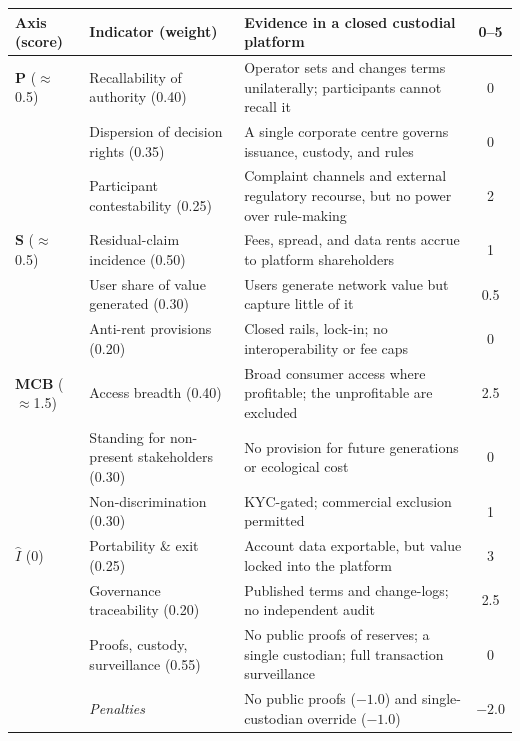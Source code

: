 \documentclass[11pt]{article}
\theoremstyle{definition}
\newcommand{\Iax}{\ensuremath{\hat{I}}}
\begin{document}
\begin{table}[!ht]
\centering\small
\renewcommand{\arraystretch}{1.25}
\begin{tabularx}{\textwidth}{@{}p{1.6cm}p{4.4cm}Xc@{}}
\toprule
\textbf{Axis (score)} & \textbf{Indicator (weight)} & \textbf{Evidence in a closed custodial platform} & \textbf{0--5} \\
\midrule
\textbf{P} \newline ($\approx$0.5)
  & Recallability of authority (0.40) & Operator sets and changes terms unilaterally; participants cannot recall it & 0 \\
  & Dispersion of decision rights (0.35) & A single corporate centre governs issuance, custody, and rules & 0 \\
  & Participant contestability (0.25) & Complaint channels and external regulatory recourse, but no power over rule-making & 2 \\
\addlinespace
\textbf{S} \newline ($\approx$0.5)
  & Residual-claim incidence (0.50) & Fees, spread, and data rents accrue to platform shareholders & 1 \\
  & User share of value generated (0.30) & Users generate network value but capture little of it & 0.5 \\
  & Anti-rent provisions (0.20) & Closed rails, lock-in; no interoperability or fee caps & 0 \\
\addlinespace
\textbf{MCB} \newline ($\approx$1.5)
  & Access breadth (0.40) & Broad consumer access where profitable; the unprofitable are excluded & 2.5 \\
  & Standing for non-present stakeholders (0.30) & No provision for future generations or ecological cost & 0 \\
  & Non-discrimination (0.30) & KYC-gated; commercial exclusion permitted & 1 \\
\addlinespace
\textbf{$\Iax$} \newline (0)
  & Portability \& exit (0.25) & Account data exportable, but value locked into the platform & 3 \\
  & Governance traceability (0.20) & Published terms and change-logs; no independent audit & 2.5 \\
  & Proofs, custody, surveillance (0.55) & No public proofs of reserves; a single custodian; full transaction surveillance & 0 \\
  & \emph{Penalties} & No public proofs ($-1.0$) and single-custodian override ($-1.0$) & $-2.0$ \\

\end{tabularx}
\end{table}
\end{document}
